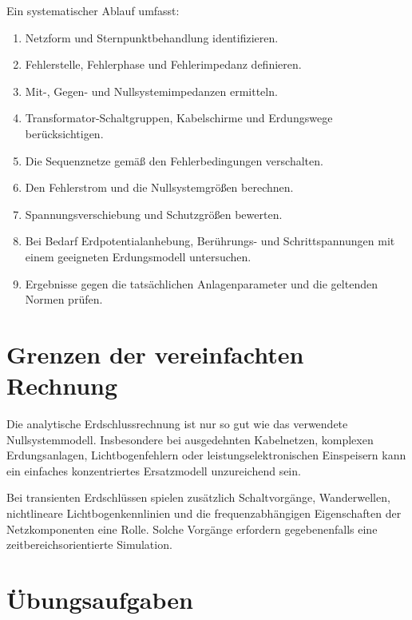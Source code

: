 Ein systematischer Ablauf umfasst:
\begin{enumerate}
  \item Netzform und Sternpunktbehandlung identifizieren.
  \item Fehlerstelle, Fehlerphase und Fehlerimpedanz definieren.
  \item Mit-, Gegen- und Nullsystemimpedanzen ermitteln.
  \item Transformator-Schaltgruppen, Kabelschirme und Erdungswege berücksichtigen.
  \item Die Sequenznetze gemäß den Fehlerbedingungen verschalten.
  \item Den Fehlerstrom und die Nullsystemgrößen berechnen.
  \item Spannungsverschiebung und Schutzgrößen bewerten.
  \item Bei Bedarf Erdpotentialanhebung, Berührungs- und Schrittspannungen
        mit einem geeigneten Erdungsmodell untersuchen.
  \item Ergebnisse gegen die tatsächlichen Anlagenparameter und die
        geltenden Normen prüfen.
\end{enumerate}

\section{Grenzen der vereinfachten Rechnung}

Die analytische Erdschlussrechnung ist nur so gut wie das verwendete
Nullsystemmodell. Insbesondere bei ausgedehnten Kabelnetzen, komplexen
Erdungsanlagen, Lichtbogenfehlern oder leistungselektronischen Einspeisern
kann ein einfaches konzentriertes Ersatzmodell unzureichend sein.

Bei transienten Erdschlüssen spielen zusätzlich Schaltvorgänge, Wanderwellen,
nichtlineare Lichtbogenkennlinien und die frequenzabhängigen Eigenschaften
der Netzkomponenten eine Rolle. Solche Vorgänge erfordern gegebenenfalls
eine zeitbereichsorientierte Simulation.

\section{Übungsaufgaben}

